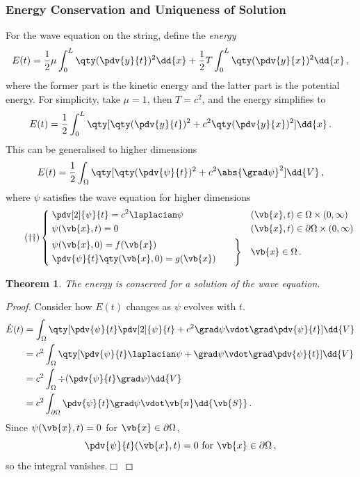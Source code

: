 \documentclass{article}
\theoremstyle{plain}\theoremheaderfont{\normalfont\itshape}\theorembodyfont{\rmfamily}\theoremseparator{.}\newtheorem*{rem}{Remark}\newtheorem*{ex}{Example}\newtheorem*{proof}{Proof}\newtheorem*{altp}{Alternative proof}
\theoremstyle{plain}\theoremheaderfont{\normalfont\bfseries}\theorembodyfont{\rmfamily}\theoremseparator{.}\newtheorem{thm}{Theorem}[section]\newtheorem{lem}[thm]{Lemma}\newtheorem{prop}[thm]{Proposition}\newtheorem*{cor}{Corollary}\newtheorem{defn}[thm]{Definition}\newtheorem{clm}[thm]{Claim}\newtheorem{clminproof}{Claim}
\theoremstyle{break}\theoremheaderfont{\normalfont\itshape}\theorembodyfont{\rmfamily}\theoremseparator{.\medskip}\newtheorem*{proofskip}{Proof}\newtheorem*{exs}{Examples}\newtheorem*{rems}{Remarks}
\theoremstyle{break}\theoremheaderfont{\normalfont\bfseries}\theorembodyfont{\rmfamily}\theoremseparator{.\medskip}\newtheorem{lemskip}[thm]{Lemma}\newtheorem{defnskip}[thm]{Definition}\newtheorem{propskip}[thm]{Proposition}\newtheorem{thmskip}[thm]{Theorem}
\numberwithin{equation}{section}
\newcommand{\qed}{\hfill\ensuremath{\Box}}
\begin{document}
	\subsubsection{Energy Conservation and Uniqueness of Solution}
	For the wave equation on the string, define the \textit{energy}
	\[E(t)=\frac{1}{2}\mu\int_{0}^{L}\qty(\pdv{y}{t})^2\dd{x}+\frac{1}{2}T\int_{0}^{L}\qty(\pdv{y}{x})^2\dd{x}\,,\]
	where the former part is the kinetic energy and the latter part is the potential energy. For simplicity, take \(\mu=1\), then \(T=c^2\), and the energy simplifies to
	\[E(t)=\frac{1}{2}\int_{0}^{L}\qty[\qty(\pdv{y}{t})^2+c^2\qty(\pdv{y}{x})^2]\dd{x}\,.\]
	This can be generalised to higher dimensions
	\[E(t)=\frac{1}{2}\int_\Omega \qty[\qty(\pdv{\psi}{t})^2+c^2\abs{\grad \psi}^2]\dd{V}\,,\]
	where \(\psi\) satisfies the wave equation for higher dimensions
	\begin{equation}\tag{\(\dagger\dagger\)}
		\left\{\begin{aligned}
			& \;\pdv[2]{\psi}{t}=c^2\laplacian \psi && (\vb{x},t)\in\Omega\times(0,\infty)\\
			& \;\psi(\vb{x},t)=0 && (\vb{x},t)\in\partial\Omega\times(0,\infty)\\
			& \left.\begin{aligned}
				& \psi(\vb{x},0)=f(\vb{x})\\
				& \pdv{\psi}{t}\qty(\vb{x},0)=g(\vb{x})
			\end{aligned}\qquad\right\} && \vb{x}\in\Omega\,.
		\end{aligned}\right.
	\end{equation}

	\begin{thm}
		The energy is conserved for a solution of the wave equation.
	\end{thm}
	\begin{proof}
		Consider how \(E(t)\) changes as \(\psi\) evolves with \(t\).
		\begin{align*}
			\dot{E}(t)&=\int_\Omega\qty[\pdv{\psi}{t}\pdv[2]{\psi}{t}+c^2\grad \psi\vdot\grad\pdv{\psi}{t}]\dd{V}\\
			&=c^2\int_\Omega\qty[\pdv{\psi}{t}\laplacian \psi+\grad \psi\vdot\grad\pdv{\psi}{t}]\dd{V}\\
			&=c^2\int_\Omega\div(\pdv{\psi}{t}\grad \psi)\dd{V}\\
			&=c^2\int_{\partial\Omega}\pdv{\psi}{t}\grad \psi\vdot\vb{n}\dd{\vb{S}}\,.
		\end{align*}
		Since \(\psi(\vb{x},t)=0\) for \(\vb{x}\in\partial\Omega\),
		\[\pdv{\psi}{t}(\vb{x},t)=0\text{ for }\vb{x}\in\partial\Omega\,,\]
		so the integral vanishes.\qed
	\end{proof}
\end{document}
